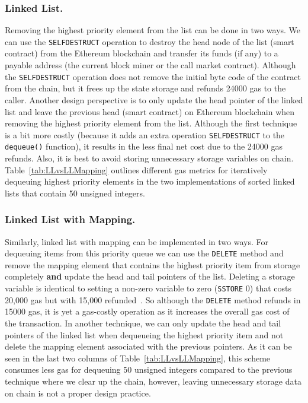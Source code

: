 



\subsubsection*{Linked List.} Removing the highest priority element from the list can be done in two ways. We can use the \texttt{SELFDESTRUCT} operation to destroy the head node of the list (\ie smart contract) from the Ethereum blockchain and transfer its funds (if any) to a payable address (\eg the current block miner or the call market contract). Although the \texttt{SELFDESTRUCT} operation does not remove the initial byte code of the contract from the chain, but it frees up the state storage and refunds 24000 gas to the caller. Another design perspective is to only update the head pointer of the linked list and leave the previous head (\ie smart contract) on Ethereum blockchain when removing the highest priority element from the list. Although the first technique is a bit more costly (because it adds an extra operation \texttt{SELFDESTRUCT} to the \texttt{dequeue()} function), it results in the less final net cost due to the 24000 gas refunds. Also, it is best to avoid storing unnecessary storage variables on chain. Table~\ref{tab:LLvsLLMapping} outlines different gas metrics for iteratively dequeuing highest priority elements in the two implementations of sorted linked lists that contain 50 unsigned integers.


\subsubsection*{Linked List with Mapping.} Similarly, linked list with mapping can be implemented in two ways. For dequeuing items from this priority queue we can use the \texttt{DELETE} method and remove the mapping element that contains the highest priority item from storage completely  \textbf{and} update the head and tail pointers of the list. Deleting a storage variable is identical to setting a non-zero variable to zero (\texttt{SSTORE} 0) that costs 20,000 gas but with 15,000 refunded~\cite{wood2014ethereum}. So although the \texttt{DELETE} method refunds in 15000 gas, it is yet a gas-costly operation  as it increases the overall gas cost of the transaction. In another technique, we can only update the head and tail pointers of the linked list when dequeueing the highest priority item and not delete the mapping element associated with the previous pointers. As it can be seen in the last two columns of Table~\ref{tab:LLvsLLMapping}, this scheme consumes less gas for dequeuing 50 unsigned integers compared to the previous technique where we clear up the chain, however, leaving unnecessary storage data on chain is not a proper design practice.


